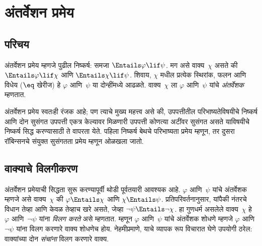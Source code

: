 \chapter{अंतर्वेशन प्रमेय}\label{mod:int::chap}









\section{परिचय}\label{mod:int:int:sec}

अंतर्वेशन प्रमेय म्हणजे पुढील निष्कर्ष: समजा
$\Entails \varphi \lif \psi$. मग असे वाक्य~$\chi$ असते की
$\Entails \varphi \lif \chi$ आणि $\Entails \chi \lif \psi$. शिवाय,
$\chi$ मधील प्रत्येक स्थिरांक, फलन आणि विधेय
($\eq$ खेरीज) हे $\varphi$ आणि~$\psi$ या दोन्हींमध्ये आढळते. वाक्य~$\chi$
ला $\varphi$ आणि~$\psi$ यांचे \emph{अंतर्वेशक} म्हणतात.

अंतर्वेशन प्रमेय स्वतःही रंजक आहे; पण त्याचे मुख्य महत्त्व असे की,
उपपत्तीतील परिभाष्यतेविषयीचे निष्कर्ष आणि दोन सुसंगत उपपत्ती एकत्र केल्यावर
मिळणारी उपपत्ती कोणत्या अटींवर सुसंगत असते याविषयीचे निष्कर्ष सिद्ध करण्यासाठी
ते वापरता येते. पहिला निष्कर्ष बेथचे परिभाष्यता प्रमेय म्हणून, तर
दुसरा रॉबिन्सनचे संयुक्त सुसंगतता प्रमेय म्हणून ओळखला जातो.












\section{वाक्याचे विलगीकरण}\label{mod:int:sep:sec}

अंतर्वेशन प्रमेयाची सिद्धता सुरू करण्यापूर्वी थोडी पूर्वतयारी आवश्यक आहे.
$\varphi$ आणि~$\psi$ यांचे अंतर्वेशक म्हणजे असे वाक्य~$\chi$ की
$\varphi \Entails \chi$ आणि $\chi \Entails \psi$. प्रतिपरिवर्तनानुसार, यांपैकी
नंतरचे विधान तेव्हा आणि केवळ तेव्हाच खरे असते, जेव्हा $\lnot \psi
\Entails \lnot \chi$. हा गुणधर्म असलेले वाक्य~$\chi$ हे $\varphi$
आणि~$\lnot \psi$ यांना \emph{विलग करते} असे म्हणतात. म्हणून $\varphi$ आणि~$\psi$
यांचे अंतर्वेशक शोधणे म्हणजे $\varphi$ आणि~$\lnot \psi$ यांना विलग करणारे
वाक्य शोधणेच होय. नेहमीप्रमाणे, याचे व्यापक रूप विचारात घेणे उपयोगी
ठरेल: वाक्यांच्या दोन \emph{संचांना} विलग करणारे वाक्य.

